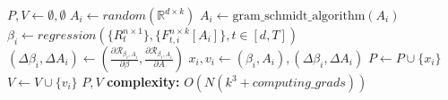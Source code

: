 \begin{algorithm}[H]
\caption{$\text{initialize\_position\_and\_velocity}(N)$}
\label{mopso:initilize_position_and_velocity}
\begin{algorithmic}[1]
\State $P, V \gets \emptyset, \emptyset$
    \State $A_i \gets random(\mathbb{R}^{d\times k})$
    \State $A_i \gets \text{gram\_schmidt\_algorithm}(A_i)$
    \State $\beta_i \gets regression(\{R^{n\times 1}_{t}\},\{F^{n\times k}_{t,i}[A_i]\}, t\in [d,T])$
    \State $(\Delta \beta_i,\Delta A_i) \gets (\frac{\partial \mathcal{R}_{\beta_i, A_{i}}}{\partial \beta},\frac{\partial \mathcal{R}_{\beta_i, A_{i}}}{\partial A})$
    \State $x_i, v_i\gets (\beta_i,A_i), (\Delta \beta_i,\Delta A_i)$
    \State $P\gets P \cup \{x_i\}$
    \State $V\gets V \cup \{v_i\}$
\EndFor
\State \Return $P, V$
\State \textbf{complexity: } $O(N(k^3+computing\_grads))$
\end{algorithmic}
\end{algorithm}

